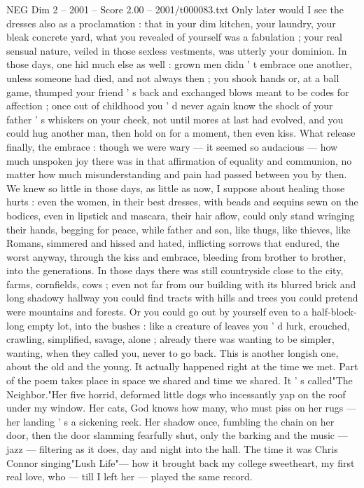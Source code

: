 \begin{textsample}{NEG Dim 2 – 2001 – Score 2.00 – 2001/t000083.txt}
Only later would I see the dresses also as a proclamation : that in your dim kitchen, your laundry, your bleak concrete yard, what you revealed of yourself was a fabulation ; your real sensual nature, veiled in those sexless vestments, was utterly your dominion.
In those days, one hid much else as well : grown men didn ' t embrace one another, unless someone had died, and not always then ; you shook hands or, at a ball game, thumped your friend ' s back and exchanged blows meant to be codes for affection ; once out of childhood you ' d never again know the shock of your father ' s whiskers on your cheek, not until mores at last had evolved, and you could hug another man, then hold on for a moment, then even kiss.
What release finally, the embrace : though we were wary — it seemed so audacious — how much unspoken joy there was in that affirmation of equality and communion, no matter how much misunderstanding and pain had passed between you by then.
We knew so little in those days, as little as now, I suppose about healing those hurts : even the women, in their best dresses, with beads and sequins sewn on the bodices, even in lipstick and mascara, their hair aflow, could only stand wringing their hands, begging for peace, while father and son, like thugs, like thieves, like Romans, simmered and hissed and hated, inflicting sorrows that endured, the worst anyway, through the kiss and embrace, bleeding from brother to brother, into the generations.
In those days there was still countryside close to the city, farms, cornfields, cows ; even not far from our building with its blurred brick and long shadowy hallway you could find tracts with hills and trees you could pretend were mountains and forests.
Or you could go out by yourself even to a half-block-long empty lot, into the bushes : like a creature of leaves you ' d lurk, crouched, crawling, simplified, savage, alone ; already there was wanting to be simpler, wanting, when they called you, never to go back.
This is another longish one, about the old and the young.
It actually happened right at the time we met.
Part of the poem takes place in space we shared and time we shared.
It ' s called"The Neighbor."Her five horrid, deformed little dogs who incessantly yap on the roof under my window.
Her cats, God knows how many, who must piss on her rugs — her landing ' s a sickening reek.
Her shadow once, fumbling the chain on her door, then the door slamming fearfully shut, only the barking and the music — jazz — filtering as it does, day and night into the hall.
The time it was Chris Connor singing"Lush Life"— how it brought back my college sweetheart, my first real love, who — till I left her — played the same record.

\end{textsample}
